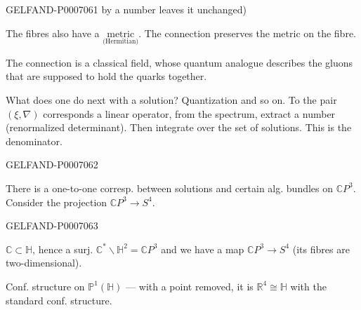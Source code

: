 \begin{GelfandAdjacentEvidence}{GELFAND-P000706}{1}
by a number leaves it unchanged)

The fibres also have a
\(\underset{\text{(Hermitian)}}{\text{metric}}\).
The connection preserves the metric on the fibre.

The connection is a classical field, whose quantum analogue describes the gluons that are supposed to hold the quarks together.

What does one do next with a solution? Quantization and so on.
To the pair \((\xi,\nabla)\) corresponds a linear operator, from the spectrum, extract a
number (renormalized determinant). Then integrate over the set of solutions.
This is the denominator.
\end{GelfandAdjacentEvidence}
\begin{GelfandAdjacentEvidence}{GELFAND-P000706}{2}


There is a one-to-one corresp. between solutions and certain alg. bundles on \(\mathbb C P^3\). Consider the projection \(\mathbb C P^3\to S^4\).

\end{GelfandAdjacentEvidence}
\begin{GelfandAdjacentEvidence}{GELFAND-P000706}{3}


\(\mathbb C\subset\mathbb H\), hence a surj.
\(\mathbb C^*\backslash\mathbb H^2=\mathbb C P^3\)
and we have a map \(\mathbb C P^3\to S^4\) (its fibres are two-dimensional).

Conf. structure on \(\mathbb P^1(\mathbb H)\) --- with a point removed, it is
\(\mathbb R^4\cong\mathbb H\) with the standard conf. structure.
\end{GelfandAdjacentEvidence}
